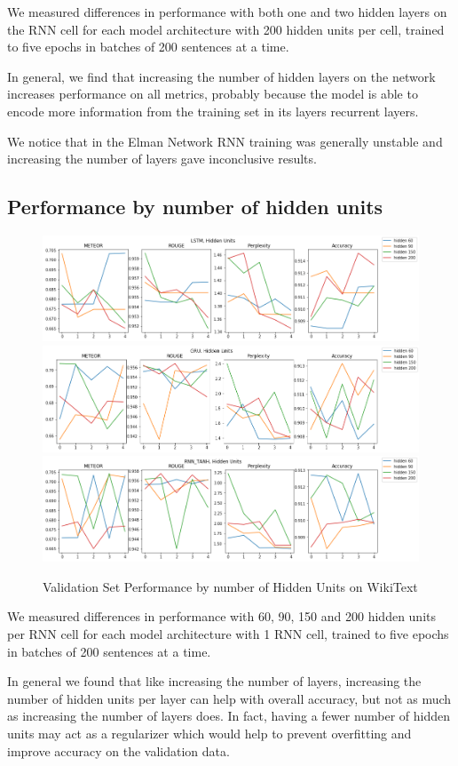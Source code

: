 \documentclass[a4paper]{article}
\begin{document}
We measured differences in performance with both one and two hidden layers
on the RNN cell for each model architecture with 200 hidden units per cell, trained
to five epochs in batches of 200 sentences at a time.

In general, we find that increasing the number of hidden layers on the network
increases performance on all metrics, probably because the model is able to
encode more information from the training set in its layers recurrent layers.

We notice that in the Elman Network RNN training was generally unstable and
increasing the number of layers gave inconclusive results.

\subsection{Performance by number of hidden units}
\label{sec:perf_by_n_hidden}

\begin{figure}[!ht]
\includegraphics[width=0.7\columnwidth]{sr-perf-by-hidden-units-lstm}
\includegraphics[width=0.7\columnwidth]{sr-perf-by-hidden-units-gru}
\includegraphics[width=0.7\columnwidth]{sr-perf-by-hidden-units-rnn}
\centering
\caption{Validation Set Performance by number of Hidden Units on WikiText}
\end{figure}

We measured differences in performance with 60, 90, 150 and 200 hidden units per
RNN cell for each model architecture with 1 RNN cell, trained
to five epochs in batches of 200 sentences at a time.

In general we found that like increasing the number of layers,
increasing the number of hidden units per layer can help with overall accuracy,
but not as much as increasing the number of layers does. In fact, having a fewer
number of hidden units may act as a regularizer which would help to prevent
overfitting and improve accuracy on the validation data.
\end{document}
